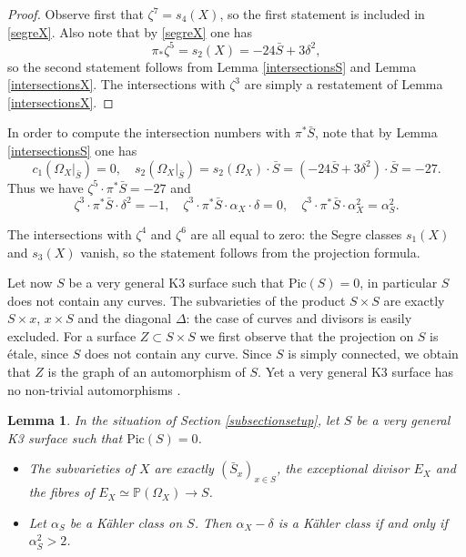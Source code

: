 \documentclass[11pt]{article}
\theoremstyle{plain}
\newtheorem{lemma}[theorem]{Lemma}
\theoremstyle{definition}
\newcommand{\PP}{\ensuremath{\mathbb{P}}}
\begin{document}
\begin{proof}
Observe first that $\zeta^7= s_4(X)$, so the first statement is included in \eqref{segreX}.
Also note that by \eqref{segreX} one has
\[
\pi_* \zeta^5 = s_2(X) = - 24 \bar S + 3 \delta^2,
\]
so the second statement follows from Lemma \ref{intersectionsS} and Lemma \ref{intersectionsX}.
The intersections with $\zeta^3$ are simply a restatement of Lemma \ref{intersectionsX}.
\end{proof}

In order to compute the intersection numbers with $\pi^* \bar S$, note that by Lemma \ref{intersectionsS}
one has
\[
c_1(\Omega_X|_{\bar S})= 0 , \quad
s_2(\Omega_X|_{\bar S}) = s_2(\Omega_X) \cdot \bar S = (-24 \bar S + 3 \delta^2) \cdot \bar S = - 27.
\]
Thus we have $\zeta^5 \cdot \pi^* \bar S= -27$ and
\begin{equation} \label{up7}
\zeta^3 \cdot \pi^* \bar S \cdot \delta^2 = -1, \quad
\zeta^3 \cdot \pi^* \bar S \cdot \alpha_X \cdot \delta = 0, \quad
\zeta^3 \cdot \pi^* \bar S \cdot \alpha_X^2 = \alpha_S^2.
\end{equation}

The intersections with $\zeta^4$ and $\zeta^6$ are all equal to zero: the
Segre classes $s_1(X)$ and $s_3(X)$ vanish, so the statement follows from the projection formula.

Let now $S$ be a very general K3 surface such that $\mbox{Pic}(S)=0$, in particular $S$ does not contain any curves.
The subvarieties of the product $S \times S$ are exactly $S \times x$, $x \times S$ and the diagonal $\Delta$: the case
of curves and divisors is easily excluded. For a surface $Z \subset S \times S$ we first observe
that the projection on $S$ is étale, since $S$ does not contain any curve. Since $S$ is simply connected, we obtain
that $Z$ is the graph of an automorphism of $S$. Yet a very general K3 surface has no non-trivial automorphisms \cite[Cor.\,1.6]{Ogu08}.

\begin{lemma} \label{lemmakaehlerX}
In the situation of Section \ref{subsectionsetup},
let $S$ be a very general K3 surface such that $\mbox{Pic}(S)=0$.
\begin{itemize}
\item The subvarieties of $X$ are exactly $(\bar S_x)_{x \in S}$, the exceptional divisor $E_X$ and the fibres of $E_X \simeq \PP(\Omega_X) \to S$.
\item Let $\alpha_S$ be a Kähler class on $S$. Then $\alpha_X-\delta$ is a Kähler class if and only if
$\alpha_S^2>2$.
\end{itemize}
\end{lemma}
\end{document}
